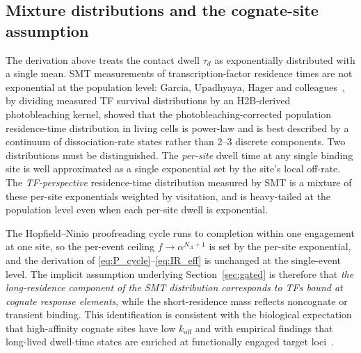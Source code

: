 \documentclass[11pt]{article}
\begin{document}
\subsection{Mixture distributions and the cognate-site assumption}
\label{ssec:mixture}

The derivation above treats the contact dwell $\tau_d$ as exponentially
distributed with a single mean. SMT measurements of transcription-factor
residence times are not exponential at the population level: Garcia,
Upadhyaya, Hager and colleagues~\cite{Garcia2021NAR}, by dividing
measured TF survival distributions by an H2B-derived photobleaching
kernel, showed that the photobleaching-corrected population
residence-time distribution in living cells is power-law and is best
described by a continuum of dissociation-rate states rather than 2--3
discrete components. Two distributions
must be distinguished. The \emph{per-site} dwell time at any single
binding site is well approximated as a single exponential set by the
site's local off-rate. The \emph{TF-perspective} residence-time
distribution measured by SMT is a mixture of these per-site exponentials
weighted by visitation, and is heavy-tailed at the population level even
when each per-site dwell is exponential.

The Hopfield--Ninio proofreading cycle runs to completion within one
engagement at one site, so the per-event ceiling
$f\to\alpha^{N_A+1}$ is set by the per-site exponential, and the
derivation of \eqref{eq:P_cycle}--\eqref{eq:IR_eff} is unchanged at the
single-event level. The implicit assumption underlying
Section~\ref{sec:gated} is therefore that \emph{the long-residence
component of the SMT distribution corresponds to TFs bound at cognate
response elements}, while the short-residence mass reflects noncognate
or transient binding. This identification is consistent with the
biological expectation that high-affinity cognate sites have low
$k_{\mathrm{off}}$ and with empirical findings that long-lived dwell-time
states are enriched at functionally engaged target loci~\cite{Garcia2021NAR}.
\end{document}

